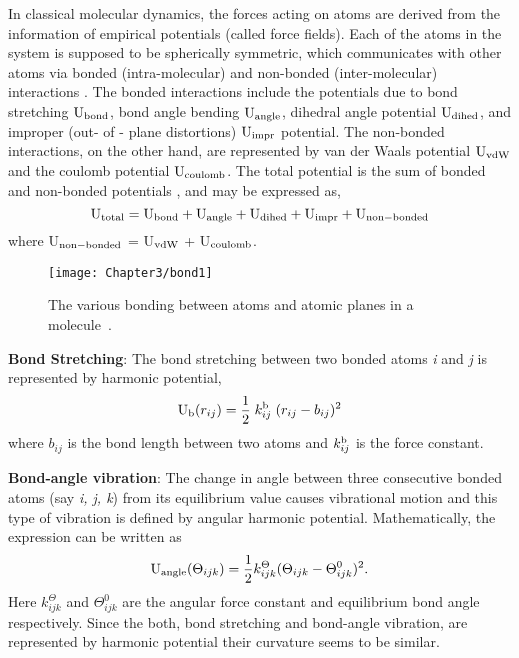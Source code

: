 In classical molecular dynamics, the forces acting on atoms are derived from the information of empirical potentials (called force fields). Each of the atoms in the system is supposed to be spherically symmetric, which communicates with other atoms via bonded (intra-molecular) and non-bonded (inter-molecular) interactions \citep{Balbuena1999}. The bonded interactions include the potentials due to bond stretching ${\rm U}_{\rm bond}$, bond angle bending ${\rm U}_{\rm angle}$, dihedral angle potential ${\rm U}_{\rm dihed}$, and improper (out- of - plane distortions) ${\rm U}_{\rm impr}$ potential. The non-bonded interactions, on the other hand, are represented by van der Waals potential ${\rm U}_{\rm vdW}$ and the coulomb potential ${\rm U}_{\rm coulomb}$. The total potential is the sum of bonded and non-bonded potentials \citep{Rapoport1997}, and may be expressed as, 
\begin{equation}
{\rm U}_{\rm total} = {\rm U}_{\rm bond} + {\rm U}_{\rm angle} + {\rm U}_{\rm dihed} + {\rm U}_{\rm impr} + {\rm U}_{\rm non-bonded} 
\end{equation}
where U$_{\rm non-bonded}$ = U$_{\rm vdW}$ + U$_{\rm coulomb}$.
\begin{figure}[h!]
\centering
\texttt{[image: Chapter3/bond1]}
\caption[The various bonding between atoms and planes in a molecule.]{The various bonding between atoms and atomic planes in a molecule~\citep{Bergethon1998}.}
\label{bond1}
\end{figure} 

{\textbf{Bond Stretching}}:
The bond stretching between two bonded atoms \emph{i} and \emph{j} is represented by harmonic potential,
\begin{equation}
{\rm U}_{\rm b}(r_{ij}) =\frac{1}{2}\;k_{ij}^{\rm b}\;(r_{ij} - b_{ij})^2 
\end{equation}
where $b_{ij}$ is the bond length between two atoms and $k_{ij}^{\rm b}$ is the force constant.

{\textbf{Bond-angle vibration}}:
The change in angle between three consecutive bonded atoms (say \emph{i, j, k}) from its equilibrium value causes vibrational motion and this type of vibration is defined by angular harmonic potential. Mathematically, the expression can be written as
\begin{equation}
{\rm U}_{\rm angle}(\Theta_{ijk}) = \frac{1}{2} k_{ijk}^{\Theta}(\Theta_{ijk}- \Theta^0_{ijk})^2.
\label{vibration}
\end{equation}
Here $k^\Theta_{ijk}$ and $\Theta^0_{ijk}$ are the angular force constant and equilibrium bond angle respectively. Since the both, bond stretching and bond-angle vibration, are represented by harmonic potential their curvature seems to be similar. 

